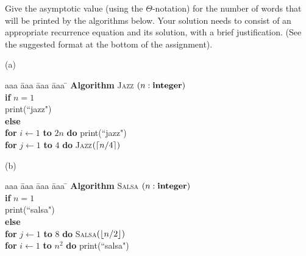 \documentclass[11pt]{article}
\begin{document}

\medskip


\lineacross


\begin{problem}
\tiny
	Give the asymptotic value (using the $\Theta$-notation)
for the number of words that will be printed by the algorithms below.
Your solution needs to consist of an appropriate recurrence
equation and its solution, with a brief justification.
(See the suggested format at the bottom of the assignment).

\bigskip
\noindent
(a)\ \
\begin{minipage}[t]{3in}
\begin{tabbing}
aaa \= aaa \= aaa \= aaa \=  \kill
\textbf{Algorithm} \textsc{Jazz} $(n: \mbox{\bf integer})$ \\
          \> \textbf{if} $n = 1$ \\
          \>\>  print(``jazz") \\
          \>\textbf{else} \\
      		\>\> \textbf{for} $i \leftarrow 1$ \textbf{to} $2n$ \textbf{do} print(``jazz")\\
          \>\>  \textbf{for} $j\leftarrow 1$ \textbf{to} $4$
				\textbf{do} \textsc{Jazz}$({\left\lceil n/4\right\rceil})$
\end{tabbing}
\end{minipage}

\bigskip
\noindent
(b)\ \
\begin{minipage}[t]{3in}
\begin{tabbing}
aaa \= aaa \= aaa \= aaa \=  \kill
\textbf{Algorithm} \textsc{Salsa} $(n: \mbox{\bf integer})$ \\
          \> \textbf{if} $n = 1$ \\
          \>\>  print(``salsa") \\
          \>\textbf{else} \\
          \>\>  \textbf{for} $j \leftarrow 1$ \textbf{to} $8$
					\textbf{do} \textsc{Salsa}$({\left\lfloor n/2\right\rfloor})$\\
      \>\> \textbf{for} $i \leftarrow 1$ \textbf{to} $n^2$ \textbf{do} print(``salsa")
\end{tabbing}
\end{minipage}


\end{problem}
\end{document}
